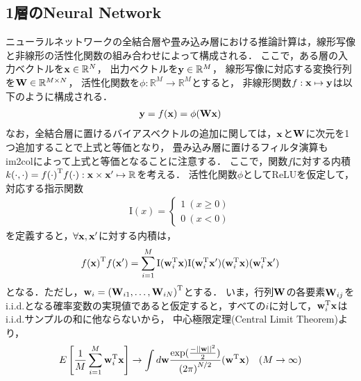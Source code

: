 \documentclass[11pt,a4j]{article}
\begin{document}
    \subsection{1層のNeural Network}
      ニューラルネットワークの全結合層や畳み込み層における推論計算は，線形写像と非線形の活性化関数の組み合わせによって構成される．
      ここで，ある層の入力ベクトルを${\bf x} \in \mathbb{R}^{N}$，
      出力ベクトルを${\bf y} \in \mathbb{R}^{M}$，
      線形写像に対応する変換行列を${\bf W} \in \mathbb{R}^{M \times N}$，
      活性化関数を$\phi: \mathbb{R}^{M} \to \mathbb{R}^{M}$とすると，
      非線形関数$f:{\bf x} \mapsto {\bf y}$は以下のように構成される．
      \begin{align}
        {\bf y} = f({\bf x}) = \phi( {\bf W x} )
      \end{align}
      なお，全結合層に置けるバイアスベクトルの追加に関しては，$\bf x$と$\bf W$に次元を1つ追加することで上式と等価となり，
      畳み込み層に置けるフィルタ演算もim2colによって上式と等価となることに注意する．
      ここで，関数$f$に対する内積$k(\cdot,\cdot) = {f(\cdot)}^{\mathrm{T}}f(\cdot): {\bf x} \times {\bf x}' \mapsto \mathbb{R}$を考える．
      活性化関数$\phi$としてReLUを仮定して，対応する指示関数
      \begin{align}
        {\mathrm{I}}(x) = 
        \begin{cases}
          1 ~ (x \geq 0) \\
          0 ~ (x < 0)
        \end{cases}
      \end{align}
      を定義すると，$\forall {\bf x},{\bf x}'$に対する内積は，
      \begin{align}
        {f({\bf x})}^{\mathrm{T}} f({\bf x}') = \sum_{i=1}^{M} 
        {\mathrm{I}}( {\bf w}_{i}^{\mathrm{T}} {\bf x} ) {\mathrm{I}}( {\bf w}_{i}^{\mathrm{T}} {\bf x}' ) 
        ( {\bf w}_{i}^{\mathrm{T}} {\bf x} ) ( {\bf w}_{i}^{\mathrm{T}} {\bf x}' )
      \end{align}
      となる．ただし，${\bf w}_i = {( {\bf W}_{i1},\dots,{\bf W}_{iN} )}^{\mathrm{T}}$とする．
      いま，行列$\bf W$の各要素${\bf W}_{ij}$をi.i.d.となる確率変数の実現値であると仮定すると，すべての$i$に対して，${\bf w}_{i}^{\mathrm{T}} {\bf x}$はi.i.d.サンプルの和に他ならないから，
      中心極限定理(Central Limit Theorem)より，
      \begin{align}
        E\left[ \frac{1}{M} \sum_{i=1}^{M} {\bf w}_{i}^{\mathrm{T}} {\bf x} \right] \to
        \int d{\bf w} \frac{\exp (\frac{- {|| {\bf w} ||}^2}{2})}{{(2 \pi)}^{N / 2}}  
        ( {\bf w}^{\mathrm{T}} {\bf x} ) ~~~ (M \to \infty)
      \end{align}
\end{document}
